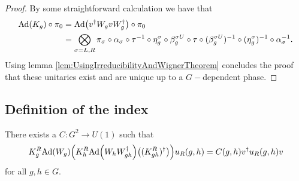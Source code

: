 \documentclass[12pt,a4paper,twoside]{article}
\numberwithin{equation}{section}
\begin{document}
\begin{proof}
	By some straightforward calculation we have that
	\begin{align}
		\Ad{K_g}\circ\pi_0&=\Ad{v^\dagger W_g v W_g^\dagger}\circ\pi_0\\
		&=\bigotimes_{\sigma=L,R}\pi_\sigma\circ\alpha_\sigma\circ\tau^{-1}\circ \eta_g^\sigma\circ\beta_g^{\sigma U}\circ\tau\circ(\beta_g^{\sigma U})^{-1}\circ(\eta_g^{\sigma})^{-1}\circ\alpha_\sigma^{-1}.
	\end{align}
	Using lemma \ref{lem:UsingIrreducibilityAndWignerTheorem} concludes the proof that these unitaries exist and are unique up to a $G-$dependent phase.
\end{proof}
\subsection{Definition of the index}\label{sec:DefinitionH2Index}
\begin{lemma}\label{lem:Definition2Cochain}
	There exists a $C:G^2\rightarrow U(1)$ such that 
	\begin{equation}\label{eq:Definition2Cochain}
		K_g^R\Ad{W_g}\left(K_h^R\Ad{W_hW_{gh}^\dagger}\left((K_{gh}^R)^\dagger\right)\right)u_
		R(g,h)=C(g,h)v^\dagger u_R(g,h)v
	\end{equation}
	for all $g,h\in G.$
\end{lemma}
\end{document}
